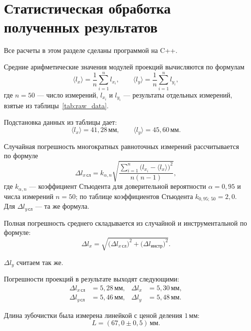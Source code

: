 \documentclass[a4paper, 14pt]{extarticle}
\begin{document}
\section*{Статистическая обработка полученных результатов}

Все расчеты в этом разделе сделаны программой на C++.

Средние арифметические значения модулей проекций вычисляются по формулам
\begin{equation}
  \langle l_x \rangle = \frac{1}{n}\sum_{i=1}^{n} l_{x_i},
  \qquad
  \langle l_y \rangle = \frac{1}{n}\sum_{i=1}^{n} l_{y_i},
\end{equation}
где $n = 50$ --- число измерений, $l_{x_i}$ и $l_{y_i}$ --- результаты отдельных измерений, взятые из таблицы~\ref{tab:raw_data}.

Подстановка данных из таблицы дает:
\[
  \langle l_x \rangle = 41{,}28\,\text{мм},
  \qquad
  \langle l_y \rangle = 45{,}60\,\text{мм}.
\]

Случайная погрешность многократных равноточных измерений рассчитывается по формуле
\begin{equation}
  \Delta l_{x\,\text{сл}}
  = k_{\alpha,n}
  \sqrt{\frac{\sum\limits_{i=1}^{n}
  \bigl(l_{x_i} - \langle l_x \rangle\bigr)^2}{n(n-1)}},
  \label{eq:rand_err}
\end{equation}
где $k_{\alpha,n}$ --- коэффициент Стьюдента для доверительной вероятности
$\alpha = 0{,}95$ и числа измерений $n = 50$; по таблице коэффициентов
Стьюдента $k_{0{,}95;\,50} = 2{,}0$. Для $\Delta l_{y\,\text{сл}}$ --- та же формула.

Полная погрешность среднего складывается из случайной и инструментальной по формуле:
\begin{equation}
  \Delta l_x
  = \sqrt{\bigl(\Delta l_{x\,\text{сл}}\bigr)^2 + \bigl(\Delta l_{\text{инстр}}\bigr)^2}.
  \label{eq:tot_err}
\end{equation}

$\Delta l_y$ считаем так же.

Погрешности проекций в результате выходят следующими:
\begin{align*}
  \Delta l_{x\,\text{сл}} &= 5{,}28\,\text{мм}, &
  \Delta l_x &= 5{,}30\,\text{мм}, \\
  \Delta l_{y\,\text{сл}} &= 5{,}46\,\text{мм}, &
  \Delta l_y &= 5{,}48\,\text{мм}.
\end{align*}

Длина зубочистки была измерена линейкой с ценой деления $1\,\text{мм}$:
\[
  L = (67{,}0 \pm 0{,}5)\,\text{мм}.
\]
\end{document}
